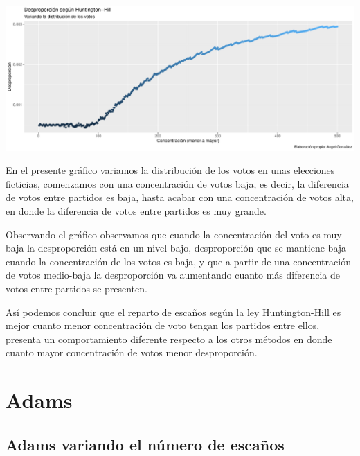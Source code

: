 \documentclass[12pt,a4paper,]{book}
\numberwithin{dummy}{section}
\theoremstyle{ocrenumbox}
\theoremstyle{blacknumex}
\theoremstyle{blacknumbox}
\theoremstyle{ocrenum}
\theoremstyle{ocrenum}
\begin{document}
\begin{center}\includegraphics[width=0.95\linewidth]{figurasR/unnamed-chunk-34-1} \end{center}

En el presente gráfico variamos la distribución de los votos en unas
elecciones ficticias, comenzamos con una concentración de votos baja, es
decir, la diferencia de votos entre partidos es baja, hasta acabar con
una concentración de votos alta, en donde la diferencia de votos entre
partidos es muy grande.

Observando el gráfico observamos que cuando la concentración del voto es
muy baja la desproporción está en un nivel bajo, desproporción que se
mantiene baja cuando la concentración de los votos es baja, y que a
partir de una concentración de votos medio-baja la desproporción va
aumentando cuanto más diferencia de votos entre partidos se presenten.

Así podemos concluir que el reparto de escaños según la ley
Huntington-Hill es mejor cuanto menor concentración de voto tengan los
partidos entre ellos, presenta un comportamiento diferente respecto a
los otros métodos en donde cuanto mayor concentración de votos menor
desproporción.

\hypertarget{adams}{%
\section{Adams}\label{adams}}

\hypertarget{adams-variando-el-nuxfamero-de-escauxf1os}{%
\subsection{Adams variando el número de
escaños}\label{adams-variando-el-nuxfamero-de-escauxf1os}}
\end{document}
